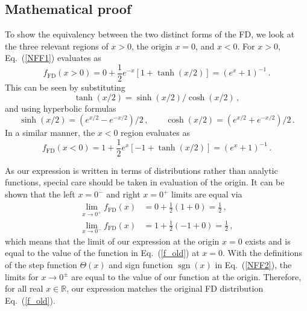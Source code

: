 \documentclass[sn-mathphys,Numbered]{sn-jnl}
\newcommand{\req}[1]{Eq.~(\ref{#1})}
\DeclareMathOperator{\sgn}{sgn}
\begin{document}
\subsection{Mathematical proof}
\label{Proof}
To show the equivalency between the two distinct forms of the FD, we look at the three relevant regions of $x>0$, the origin $x=0$, and $x<0$. For $x>0$, \req{NFF1} evaluates as
\begin{equation}
    f_\mathrm{FD}(x>0) = 0 + \frac{1}{2}e^{-x}[1+\tanh(x/2)] = (e^x + 1)^{-1}\,.
\end{equation}
This can be seen by substituting
\begin{equation}
    \tanh(x/2)=\sinh(x/2)/\cosh(x/2)\,,
\end{equation}
and using hyperbolic formulas
\begin{equation}
    \sinh(x/2)=(e^{x/2}-e^{-x/2})/2\,,\qquad
    \cosh(x/2) = (e^{x/2}+e^{-x/2})/2\,.
\end{equation}
In a similar manner, the $x<0$ region evaluates as
\begin{equation}
    f_\mathrm{FD}(x<0) = 1 + \frac{1}{2}e^{x}[-1 + \tanh(x/2)] = (e^x + 1)^{-1}\,.
\end{equation}

As our expression is written in terms of distributions rather than analytic functions, special care should be taken in evaluation of the origin. It can be shown that the left $x=0^{-}$ and right $x=0^{+}$ limits are equal via
\begin{align}
    \lim_{x\rightarrow 0^+} f_\mathrm{FD}(x) &= 0 + \frac{1}{2}(1 + 0) = \frac{1}{2}\,,\\
    \lim_{x\rightarrow 0^-} f_\mathrm{FD}(x) &= 1 + \frac{1}{2}(-1 + 0) = \frac{1}{2}\,,
\end{align}
which means that the limit of our expression at the origin $x=0$ exists and is equal to the value of the function in \req{f_old} at $x = 0$. With the definitions of the step function $\Theta(x)$ and sign function $\sgn(x)$ in \req{NFF2}, the limits for $x\rightarrow0^{\pm}$ are equal to the value of our function at the origin. Therefore, for all real $x\in\mathbb{R}$, our expression matches the original FD distribution \req{f_old}.
\end{document}
